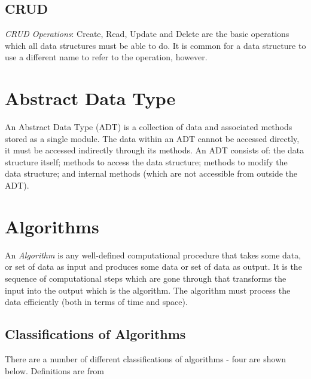 \subsection{CRUD}
\textit{CRUD Operations}: Create, Read, Update and Delete are the basic operations which all data structures must be able to do. It is common for a data structure to use a different name to refer to the operation, however. 

\section{Abstract Data Type}
An Abstract Data Type (ADT) is a collection of data and associated methods stored as a single module. The data within an ADT cannot be accessed directly, it must be accessed indirectly through its methods. An ADT consists of: the data structure itself; methods to access the data structure; methods to modify the data structure; and internal methods (which are not accessible from outside the ADT).

\section{Algorithms}
An \textit{Algorithm} is any well-defined computational procedure that takes some data, or set of data as input and produces some data or set of data as output. It is the sequence of computational steps which are gone through that transforms the input into the output which is the algorithm. The algorithm must process the data efficiently (both in terms of time and space).

\subsection{Classifications of Algorithms}
There are a number of different classifications of algorithms - four are shown below. Definitions are from 
